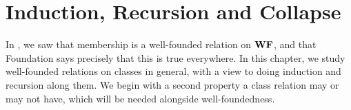 \chapter{Induction, Recursion and Collapse} \label{Ch2:CH}
\thispagestyle{empty}

In , we saw that membership is a well-founded relation on $\mathbf{WF}$, and that Foundation says precisely that this is true everywhere. In this chapter, we study well-founded relations on classes in general, with a view to doing induction and recursion along them. We begin with a second property a class relation may or may not have, which will be needed alongside well-foundedness.



